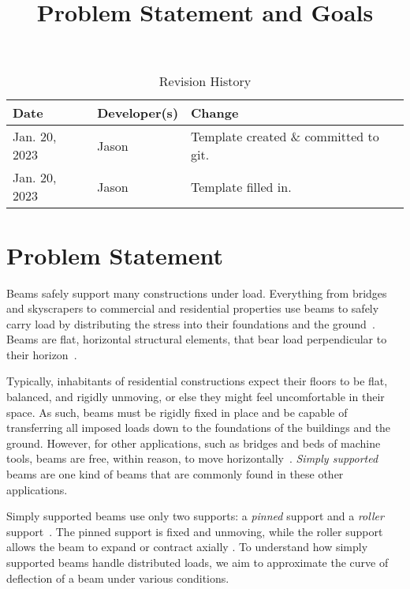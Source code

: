 \documentclass{article}
\title{Problem Statement and Goals\\\progname{}}
\author{\authname}
\date{}
\begin{document}
\maketitle

\begin{table}[hp]
    \caption{Revision History} \label{TblRevisionHistory}
    \begin{tabularx}{\textwidth}{llX}
        \toprule
        \textbf{Date} & \textbf{Developer(s)} & \textbf{Change}                  \\
        \midrule
        Jan. 20, 2023 & Jason                 & Template created \& committed to
        git.
        \\
        Jan. 20, 2023 & Jason                 & Template filled in.              \\
        \bottomrule
    \end{tabularx}
\end{table}

\section{Problem Statement}
\label{problem-statement}

Beams safely support many constructions under load. Everything from bridges and
skyscrapers to commercial and residential properties use beams to safely carry
load by distributing the stress into their foundations and the ground\
\cite{Moscovitch2020}. Beams are flat, horizontal structural elements, that bear
load perpendicular to their horizon\ \cite{Moscovitch2020}.

Typically, inhabitants of residential constructions expect their floors to be
flat, balanced, and rigidly unmoving, or else they might feel uncomfortable in
their space. As such, beams must be rigidly fixed in place and be capable of
transferring all imposed loads down to the foundations of the buildings and the
ground. However, for other applications, such as bridges and beds of machine
tools, beams are free, within reason, to move horizontally\
\cite{BirdChivers1993}. \textit{Simply supported} beams are one kind of beams
that are commonly found in these other applications.

Simply supported beams use only two supports: a \textit{pinned} support and a
\textit{roller} support\ \cite{Lemonis2022}. The pinned support is fixed and
unmoving, while the roller support allows the beam to expand or contract axially
\cite{Lemonis2022}. To understand how simply supported beams handle distributed
loads, we aim to approximate the curve of deflection of a beam under various
conditions.
\end{document}
